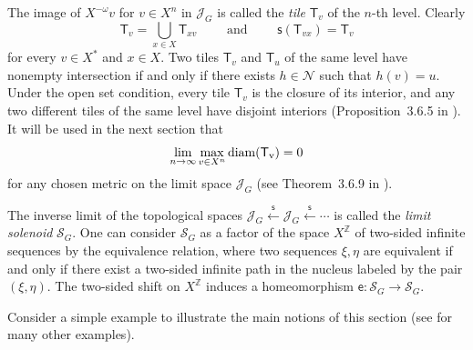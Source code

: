 \documentclass[12pt]{article}
\newcommand{\xmo}{X^{-\omega}}
\newcommand{\xz}{X^{\mathbb{Z}}}
\newcommand{\sol}[1][G]{\mathcal{S}_{#1}}
\newcommand{\lims}[1][G]{\mathscr{J}_{#1}}
\newcommand{\si}{\mathsf{s}}
\newcommand{\e}{\mathsf{e}}
\newcommand{\T}{\mathsf{T}}
\newcommand{\nucl}{\mathcal{N}}
\theoremstyle{definition}
\begin{document}
The image of $\xmo v$ for $v\in X^{n}$ in $\lims$ is called the \textit{tile} $\T_v$ of the $n$-th
level. Clearly
\[
\T_v=\bigcup_{x\in X}\T_{xv}\qquad\mbox{ and }\qquad \si(\T_{vx})=\T_v
\]
for every $v\in X^{*}$ and $x\in X$. Two tiles $\T_v$ and $\T_u$ of the same level have nonempty
intersection if and only if there exists $h\in\nucl$ such that $h(v)=u$. Under the open set
condition, every tile $\T_v$ is the closure of its interior, and any two different tiles of the
same level have disjoint interiors (Proposition~3.6.5 in \cite{self_sim_groups}). It will be used
in the next section that
\begin{equation}\label{eqn_diam_tile_goes_zero}
\lim_{n\rightarrow\infty} \max_{v\in X^n} \rm{diam} (\T_v)=0
\end{equation}
for any chosen metric on the limit space $\lims$ (see Theorem~3.6.9 in \cite{self_sim_groups}).

The inverse limit of the topological spaces $\lims\stackrel{\si}{\leftarrow} \lims
\stackrel{\si}{\leftarrow} \cdots$ is called the \textit{limit solenoid} $\sol$. One can consider
$\sol$ as a factor of the space $\xz$ of two-sided infinite sequences by the equivalence relation,
where two sequences $\xi,\eta$ are equivalent if and only if there exist a two-sided infinite path
in the nucleus labeled by the pair $(\xi,\eta)$. The two-sided shift on $\xz$ induces a
homeomorphism $\e:\sol\rightarrow\sol$.


Consider a simple example to illustrate the main notions of this section (see
\cite[Chapter~6]{self_sim_groups} for many other examples).
\end{document}
